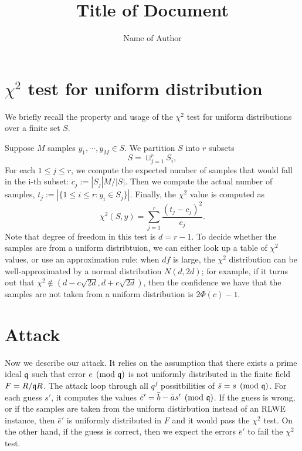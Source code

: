 \documentclass{amsart}
\title{Title of Document}
\author{Name of Author}
\begin{document}
\maketitle


\section{$\chi^2$ test for uniform distribution}

We briefly recall the property and usage of the $\chi^2$ test for uniform distributions over a finite set $S$.

Suppose  $M$ samples $y_1, \cdots, y_M \in S$. We partition $S$ into $r$ subsets
\[
    S = \sqcup_{j=1}^r S_i,
\]
For each $1 \leq j \leq r$, we compute the expected number of samples that would fall in the i-th subset: $c_j := |S_j|M/|S|$. Then we compute the actual number of samples, $t_j := |\{1 \leq i \leq r: y_i \in S_j\}|$. Finally, the $\chi^2$ value is computed as
\[
    \chi^2(S,y) = \sum_{j = 1}^r \frac{(t_j -c_j)^2}{c_j}.
\]
Note that degree of freedom in this test is $d = r-1$.
To decide whether the samples are from a uniform distribtuion, we can either look up a table of $\chi^2$ values, or use an approximation rule:  when $df$ is large, the $\chi^2$ distribution can be well-approximated by a normal distribution $N(d, 2d)$; for example, if it turns out that $\chi^2 \notin (d - c \sqrt{2d}, d+ c \sqrt{2d})$, then the confidence we have that the samples are not taken from a uniform distribution is
$2\Phi(c) - 1$.

\section{Attack}


Now we describe our attack. It relies on the assumption that there exists a prime ideal $\mathfrak{q}$ such that error $e \pmod {\mathfrak{q}}$ is not uniformly distributed in the finite field $F = R/\mathfrak{q} R$. The attack loop through all $q^f$ possitbilities of $\bar{s} = s \pmod{\mathfrak{q}}$. For each guess $s'$, it computes the values $\bar{e}' = \bar{b} - \bar{a} s' \pmod {\mathfrak{q}}$. If the guess is wrong, or if the samples are taken from the uniform distirbution instead of an RLWE instance, then $\bar{e}'$ is uniformly distributed in $F$ and it would pass the $\chi^2$ test. On the other hand, if the guess is correct, then we expect the errors $\bar{e}'$ to fail the $\chi^2$ test.
\end{document}
